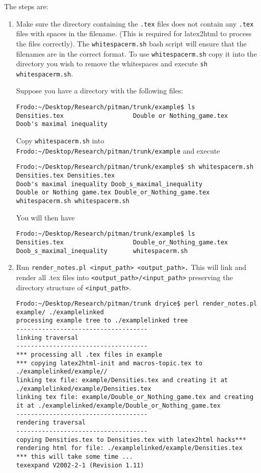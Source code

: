 \documentclass[10pt]{article}
\begin{document}
The steps are:
\begin{enumerate}
\item Make sure the directory containing the \verb#.tex# files does not contain any \verb#.tex# files with spaces in the filename. (This is required for latex2html to process the files correctly). The \verb#whitespacerm.sh# bash script will ensure that the filenames are in the correct format. To use
\verb#whitespacerm.sh# copy it into the directory you wish to remove the whitespaces and execute \verb#sh whitespacerm.sh#.

Suppose you have a directory with the following files:
\begin{verbatim}
Frodo:~/Desktop/Research/pitman/trunk/example$ ls
Densities.tex                   Double or Nothing_game.tex
Doob's maximal inequality       
\end{verbatim}

Copy \verb#whitespacerm.sh# into \verb#Frodo:~/Desktop/Research/pitman/trunk/example#
and execute

\begin{verbatim}
Frodo:~/Desktop/Research/pitman/trunk/example$ sh whitespacerm.sh 
Densities.tex Densities.tex
Doob's maximal inequality Doob_s_maximal_inequality
Double or Nothing game.tex Double_or_Nothing_game.tex
whitespacerm.sh whitespacerm.sh
\end{verbatim}

You will then have
\begin{verbatim}
Frodo:~/Desktop/Research/pitman/trunk/example$ ls
Densities.tex                   Double_or_Nothing_game.tex
Doob_s_maximal_inequality       whitespacerm.sh
\end{verbatim}

\item Run \verb#render_notes.pl <input_path> <output_path>.#
This will link and render all .tex files into \verb#<output_path>/<input_path># preserving the directory structure of \verb#<input_path>#.

\begin{verbatim}
Frodo:~/Desktop/Research/pitman/trunk dryice$ perl render_notes.pl example/ ./examplelinked
processing example tree to ./examplelinked tree
------------------------------------
linking traversal
------------------------------------
*** processing all .tex files in example
*** copying latex2html-init and macros-topic.tex to ./examplelinked/example//
linking tex file: example/Densities.tex and creating it at ./examplelinked/example/Densities.tex
linking tex file: example/Double_or_Nothing_game.tex and creating it at ./examplelinked/example/Double_or_Nothing_game.tex
------------------------------------
rendering traversal
------------------------------------
copying Densities.tex to Densities.tex with latex2html hacks*** rendering html for file: ./examplelinked/example/Densities.tex
*** this will take some time ...
texexpand V2002-2-1 (Revision 1.11)


\end{verbatim}
\end{enumerate}
\end{document}
